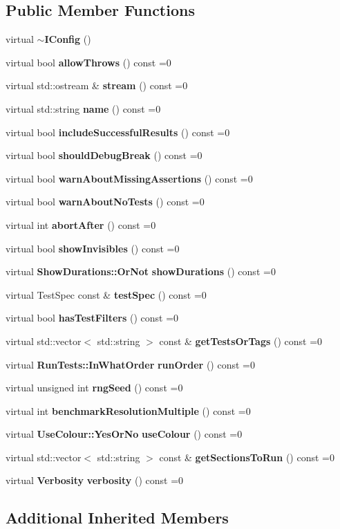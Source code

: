 \subsection*{Public Member Functions}
\begin{DoxyCompactItemize}
\item 
virtual \textbf{ $\sim$\+I\+Config} ()
\item 
virtual bool \textbf{ allow\+Throws} () const =0
\item 
virtual std\+::ostream \& \textbf{ stream} () const =0
\item 
virtual std\+::string \textbf{ name} () const =0
\item 
virtual bool \textbf{ include\+Successful\+Results} () const =0
\item 
virtual bool \textbf{ should\+Debug\+Break} () const =0
\item 
virtual bool \textbf{ warn\+About\+Missing\+Assertions} () const =0
\item 
virtual bool \textbf{ warn\+About\+No\+Tests} () const =0
\item 
virtual int \textbf{ abort\+After} () const =0
\item 
virtual bool \textbf{ show\+Invisibles} () const =0
\item 
virtual \textbf{ Show\+Durations\+::\+Or\+Not} \textbf{ show\+Durations} () const =0
\item 
virtual Test\+Spec const  \& \textbf{ test\+Spec} () const =0
\item 
virtual bool \textbf{ has\+Test\+Filters} () const =0
\item 
virtual std\+::vector$<$ std\+::string $>$ const  \& \textbf{ get\+Tests\+Or\+Tags} () const =0
\item 
virtual \textbf{ Run\+Tests\+::\+In\+What\+Order} \textbf{ run\+Order} () const =0
\item 
virtual unsigned int \textbf{ rng\+Seed} () const =0
\item 
virtual int \textbf{ benchmark\+Resolution\+Multiple} () const =0
\item 
virtual \textbf{ Use\+Colour\+::\+Yes\+Or\+No} \textbf{ use\+Colour} () const =0
\item 
virtual std\+::vector$<$ std\+::string $>$ const  \& \textbf{ get\+Sections\+To\+Run} () const =0
\item 
virtual \textbf{ Verbosity} \textbf{ verbosity} () const =0
\end{DoxyCompactItemize}
\subsection*{Additional Inherited Members}


